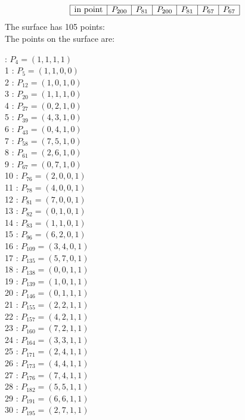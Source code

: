 \documentclass{article}
\begin{document}
{$$\begin{array}{|r*{6}{|c}|}
\hline
\mbox{in point}  & P_{200} & P_{81} & P_{200} & P_{81} & P_{67} & P_{67}\\
\hline
\end{array}
$$
The surface has 105 points:\\
The points on the surface are:\\
\begin{multicols}{3}
 : $P_{4}=( 1, 1, 1, 1 )$\\
1 : $P_{5}=( 1, 1, 0, 0 )$\\
2 : $P_{12}=( 1, 0, 1, 0 )$\\
3 : $P_{20}=( 1, 1, 1, 0 )$\\
4 : $P_{27}=( 0, 2, 1, 0 )$\\
5 : $P_{39}=( 4, 3, 1, 0 )$\\
6 : $P_{43}=( 0, 4, 1, 0 )$\\
7 : $P_{58}=( 7, 5, 1, 0 )$\\
8 : $P_{61}=( 2, 6, 1, 0 )$\\
9 : $P_{67}=( 0, 7, 1, 0 )$\\
10 : $P_{76}=( 2, 0, 0, 1 )$\\
11 : $P_{78}=( 4, 0, 0, 1 )$\\
12 : $P_{81}=( 7, 0, 0, 1 )$\\
13 : $P_{82}=( 0, 1, 0, 1 )$\\
14 : $P_{83}=( 1, 1, 0, 1 )$\\
15 : $P_{96}=( 6, 2, 0, 1 )$\\
16 : $P_{109}=( 3, 4, 0, 1 )$\\
17 : $P_{135}=( 5, 7, 0, 1 )$\\
18 : $P_{138}=( 0, 0, 1, 1 )$\\
19 : $P_{139}=( 1, 0, 1, 1 )$\\
20 : $P_{146}=( 0, 1, 1, 1 )$\\
21 : $P_{155}=( 2, 2, 1, 1 )$\\
22 : $P_{157}=( 4, 2, 1, 1 )$\\
23 : $P_{160}=( 7, 2, 1, 1 )$\\
24 : $P_{164}=( 3, 3, 1, 1 )$\\
25 : $P_{171}=( 2, 4, 1, 1 )$\\
26 : $P_{173}=( 4, 4, 1, 1 )$\\
27 : $P_{176}=( 7, 4, 1, 1 )$\\
28 : $P_{182}=( 5, 5, 1, 1 )$\\
29 : $P_{191}=( 6, 6, 1, 1 )$\\
30 : $P_{195}=( 2, 7, 1, 1 )$\\

\end{multicols}}
\end{document}
